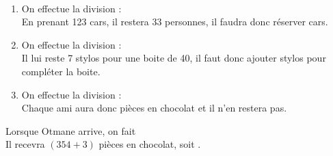    \ \\ [-5mm]
   \begin{enumerate}
      \item On effectue la division : {\small {}} \\
         En prenant 123 cars, il restera 33 personnes, il faudra donc réserver { cars}.
      \item On effectue la division : {\small {}} \\
         Il lui reste 7 stylos pour une boite de 40, il faut donc ajouter { stylos} pour compléter la boite.
      \item On effectue la division : {\small {}} \\
         Chaque ami aura donc { pièces en chocolat} et il n'en restera        pas.
   \end{enumerate}

\Coupe


   Lorsque Otmane arrive, on fait {\small {}} \\
   Il recevra $(354+3)$ pièces en chocolat, soit {}. \\
